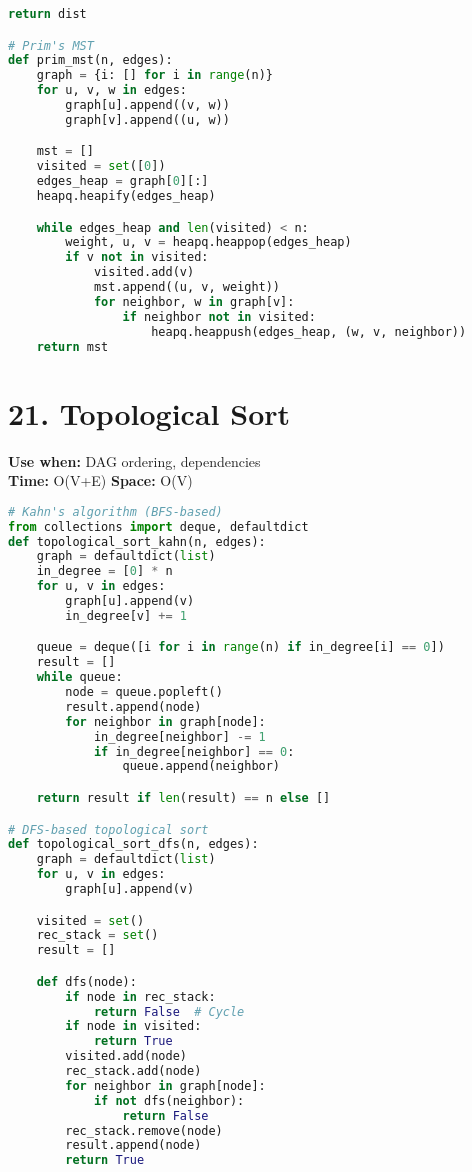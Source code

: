 \documentclass[8pt,landscape]{article}
\begin{document}
\begin{multicols}{3}
\begin{lstlisting}[language=Python]
    return dist

# Prim's MST
def prim_mst(n, edges):
    graph = {i: [] for i in range(n)}
    for u, v, w in edges:
        graph[u].append((v, w))
        graph[v].append((u, w))

    mst = []
    visited = set([0])
    edges_heap = graph[0][:]
    heapq.heapify(edges_heap)

    while edges_heap and len(visited) < n:
        weight, u, v = heapq.heappop(edges_heap)
        if v not in visited:
            visited.add(v)
            mst.append((u, v, weight))
            for neighbor, w in graph[v]:
                if neighbor not in visited:
                    heapq.heappush(edges_heap, (w, v, neighbor))
    return mst
\end{lstlisting}

\section*{21. Topological Sort}
\textbf{Use when:} DAG ordering, dependencies \\
\textbf{Time:} O(V+E) \quad \textbf{Space:} O(V)
\begin{lstlisting}[language=Python]
# Kahn's algorithm (BFS-based)
from collections import deque, defaultdict
def topological_sort_kahn(n, edges):
    graph = defaultdict(list)
    in_degree = [0] * n
    for u, v in edges:
        graph[u].append(v)
        in_degree[v] += 1

    queue = deque([i for i in range(n) if in_degree[i] == 0])
    result = []
    while queue:
        node = queue.popleft()
        result.append(node)
        for neighbor in graph[node]:
            in_degree[neighbor] -= 1
            if in_degree[neighbor] == 0:
                queue.append(neighbor)

    return result if len(result) == n else []

# DFS-based topological sort
def topological_sort_dfs(n, edges):
    graph = defaultdict(list)
    for u, v in edges:
        graph[u].append(v)

    visited = set()
    rec_stack = set()
    result = []

    def dfs(node):
        if node in rec_stack:
            return False  # Cycle
        if node in visited:
            return True
        visited.add(node)
        rec_stack.add(node)
        for neighbor in graph[node]:
            if not dfs(neighbor):
                return False
        rec_stack.remove(node)
        result.append(node)
        return True


\end{lstlisting}
\end{multicols}
\end{document}
